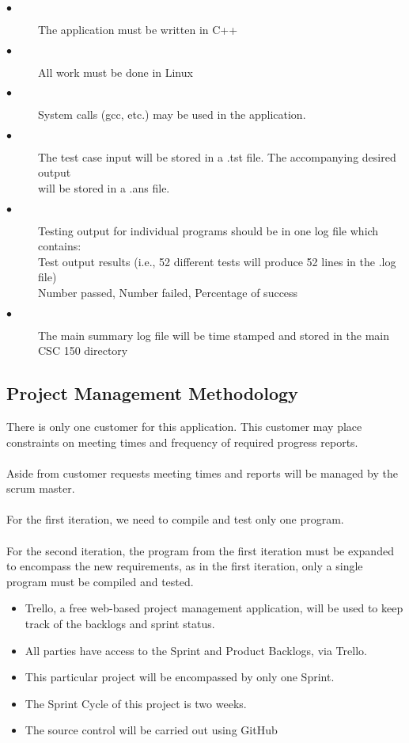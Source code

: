 \begin{description}
\item [$\bullet$] The application must be written in C++
\item [$\bullet$] All work must be done in Linux
\item [$\bullet$] System calls (gcc, etc.) may be used in the application.
\item [$\bullet$] The test case input will be stored in a .tst file. The accompanying
 desired output \\ will be stored in a .ans file.
\item [$\bullet$] Testing output for individual programs should be in one log file which contains: \\
\hspace{4ex} Test output results (i.e., 52 different tests will produce 52 lines in the .log file) \\
\hspace{4ex} Number passed, Number failed, Percentage of success
\item [$\bullet$] The main summary log file will be time stamped and stored in the main CSC 150 directory
\end{description}


\subsection{Project  Management Methodology}
There is only one customer for this application. This customer may place constraints
on meeting times and frequency of required progress reports. 
\\
\\Aside from customer
requests meeting times and reports will be managed by the scrum master.
\\ 
\\For the first iteration, we need to compile and test only one program. 
\\
\\For the second iteration, the program from the first iteration must be expanded to encompass the new requirements, 
as in the first iteration, only a single program must be compiled and tested.

 
\begin{itemize}
\item Trello, a free web-based project management application, will be used to keep
         track of the backlogs and sprint status.
\item All parties have access to the Sprint and Product Backlogs, via Trello.
\item This particular project will be encompassed by only one Sprint.
\item The Sprint Cycle of this project is two weeks.
\item The source control will be carried out using GitHub
\end{itemize}

